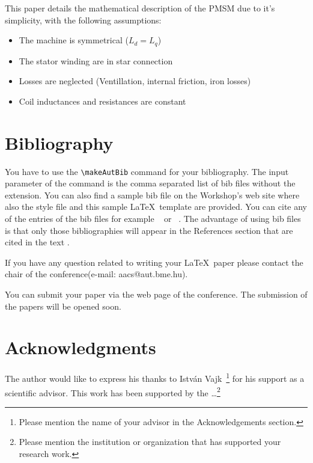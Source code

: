\documentclass[twoside,b5paper,10pt]{article}
\begin{document}


This paper details the mathematical description of the PMSM due to it's simplicity, with the following assumptions:
\begin{itemize}
  \item The machine is symmetrical ($L_d = L_q$)
  \item The stator winding are in star connection
  \item Losses are neglected (Ventillation, internal friction, iron losses)
  \item Coil inductances and resistances are constant
\end{itemize}














\section{Bibliography}
\label{sec:bib}

You have to use the \verb|\makeAutBib| command for your
bibliography. The input parameter of the command is the comma
separated list of bib files without the extension. You can also find
a sample bib file on the Workshop's web site where also the style
file and this sample \LaTeX \ template are provided. You can cite
any of the entries of the bib files for example ~\cite{ han00mining}
or ~\cite{burdick01mafia}. The advantage of using bib files is that
only those bibliographies will appear in the References section that
are cited in the text \cite{proba}.

If you have any question related to writing your \LaTeX \ paper
please contact the chair of the conference(e-mail: aacs@aut.bme.hu).

You can submit your paper via the web page of the conference. The
submission of the papers will be opened soon.

\section*{Acknowledgments}
 { \small The author would like to express his thanks to István Vajk~\footnote{Please mention the name of your advisor in the
Acknowledgements section. } for his support as a scientific advisor.
This work has been supported by the \dots \footnote{Please mention
the institution or organization that has supported your research
work.} }

\end{document}
